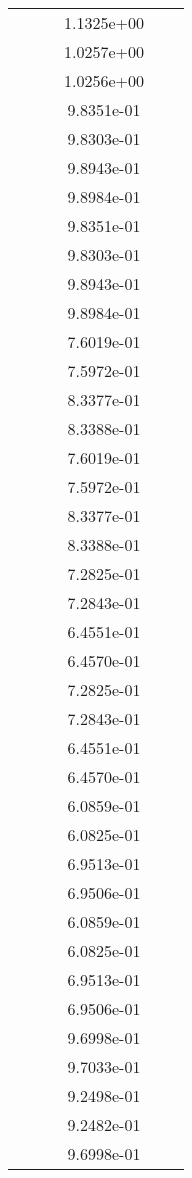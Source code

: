 \begin{xltabular}{\textwidth}{r|rS[table-format=1.3e+2]S[table-format=1.4e+2]S[table-format=1.4e+2]S[table-format=-1.5]}
&  &  & 1.1325e+00 & & \\
&  &  & 1.0257e+00 & & \\
&  &  & 1.0256e+00 & & \\
&  &  & 9.8351e-01 & & \\
&  &  & 9.8303e-01 & & \\
&  &  & 9.8943e-01 & & \\
&  &  & 9.8984e-01 & & \\
&  &  & 9.8351e-01 & & \\
&  &  & 9.8303e-01 & & \\
&  &  & 9.8943e-01 & & \\
&  &  & 9.8984e-01 & & \\
&  &  & 7.6019e-01 & & \\
&  &  & 7.5972e-01 & & \\
&  &  & 8.3377e-01 & & \\
&  &  & 8.3388e-01 & & \\
&  &  & 7.6019e-01 & & \\
&  &  & 7.5972e-01 & & \\
&  &  & 8.3377e-01 & & \\
&  &  & 8.3388e-01 & & \\
&  &  & 7.2825e-01 & & \\
&  &  & 7.2843e-01 & & \\
&  &  & 6.4551e-01 & & \\
&  &  & 6.4570e-01 & & \\
&  &  & 7.2825e-01 & & \\
&  &  & 7.2843e-01 & & \\
&  &  & 6.4551e-01 & & \\
&  &  & 6.4570e-01 & & \\
&  &  & 6.0859e-01 & & \\
&  &  & 6.0825e-01 & & \\
&  &  & 6.9513e-01 & & \\
&  &  & 6.9506e-01 & & \\
&  &  & 6.0859e-01 & & \\
&  &  & 6.0825e-01 & & \\
&  &  & 6.9513e-01 & & \\
&  &  & 6.9506e-01 & & \\
&  &  & 9.6998e-01 & & \\
&  &  & 9.7033e-01 & & \\
&  &  & 9.2498e-01 & & \\
&  &  & 9.2482e-01 & & \\
&  &  & 9.6998e-01 & & \\

\end{xltabular}
